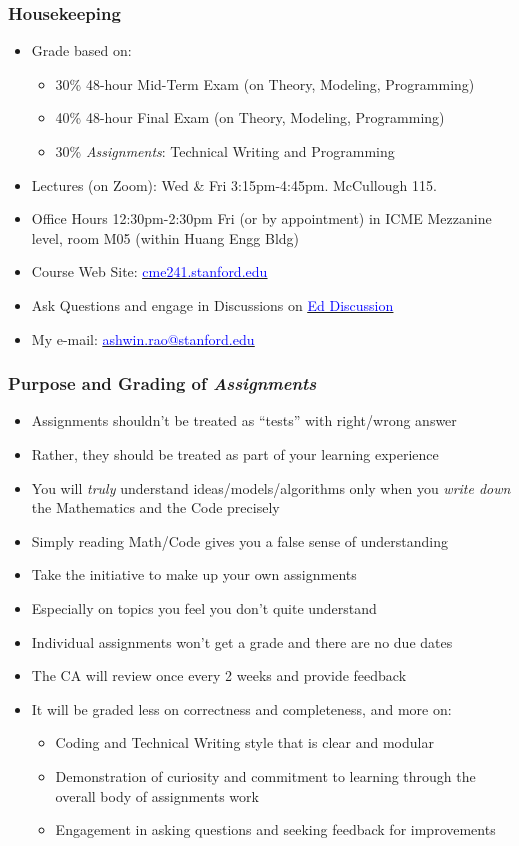 \documentclass[handout]{beamer}
\begin{document}
\begin{frame}
\frametitle{Housekeeping}
\pause
\begin{itemize}[<+->]
\item Grade based on:
\begin{itemize}
\item 30\% 48-hour Mid-Term Exam (on Theory, Modeling, Programming)
\item 40\% 48-hour Final Exam (on Theory, Modeling, Programming)
\item 30\% {\em Assignments}: Technical Writing and Programming
\end{itemize}
\item Lectures (on Zoom): Wed \& Fri 3:15pm-4:45pm. McCullough 115.
\item Office Hours 12:30pm-2:30pm Fri (or by appointment) in ICME Mezzanine level, room M05 (within Huang Engg Bldg)
\item Course Web Site: \href{http://cme241.stanford.edu}{\underline{\textcolor{blue}{cme241.stanford.edu}}}
\item Ask Questions and engage in Discussions on \href{https://edstem.org/us/courses/16175}{\underline{\textcolor{blue}{Ed Discussion}}}
\item My e-mail: \href{mailto:ashwin.rao@stanford.edu}{\underline{\textcolor{blue}{ashwin.rao@stanford.edu}}}
\end{itemize}
\end{frame}

\begin{frame}
\frametitle{Purpose and Grading of {\em Assignments}}
\pause
\begin{itemize}[<+->]
\item Assignments shouldn't be treated as ``tests'' with right/wrong answer
\item Rather, they should be treated as part of your learning experience
\item You will {\em truly} understand ideas/models/algorithms only when you {\em write down} the Mathematics and the Code precisely
\item Simply reading Math/Code gives you a false sense of understanding
\item Take the initiative to make up your own assignments
\item Especially on topics you feel you don't quite understand
\item Individual assignments won't get a grade and there are no due dates
\item The CA will review once every 2 weeks and provide feedback
\item It will be graded less on correctness and completeness, and more on:
\begin{itemize}
\item Coding and Technical Writing style that is clear and modular
\item Demonstration of curiosity and commitment to learning through the overall body of assignments work
\item Engagement in asking questions and seeking feedback for improvements
\end{itemize}
\end{itemize}
\end{frame}
\end{document}
